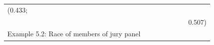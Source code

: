 \documentclass[11pt,a4paper,openany]{book}
\begin{document}
\begin{longtable}[]{@{}lrrrrrrr@{}}
\begin{minipage}[t]{0.07\columnwidth}
(0.433;\strut
\end{minipage}\tabularnewline
\begin{minipage}[t]{0.35\columnwidth}\raggedright\strut
\strut
\end{minipage} & \begin{minipage}[t]{0.05\columnwidth}\raggedleft\strut
\strut
\end{minipage} & \begin{minipage}[t]{0.04\columnwidth}\raggedleft\strut
\strut
\end{minipage} & \begin{minipage}[t]{0.06\columnwidth}\raggedleft\strut
\strut
\end{minipage} & \begin{minipage}[t]{0.11\columnwidth}\raggedleft\strut
\strut
\end{minipage} & \begin{minipage}[t]{0.05\columnwidth}\raggedleft\strut
\strut
\end{minipage} & \begin{minipage}[t]{0.05\columnwidth}\raggedleft\strut
\strut
\end{minipage} & \begin{minipage}[t]{0.07\columnwidth}\raggedleft\strut
0.507)\strut
\end{minipage}\tabularnewline
\begin{minipage}[t]{0.35\columnwidth}\raggedright\strut
Example 5.2: Race of members of jury panel\strut
\end{minipage} & \begin{minipage}[t]{0.05\columnwidth}\raggedleft\strut
\strut
\end{minipage} & \begin{minipage}[t]{0.04\columnwidth}\raggedleft\strut
\strut
\end{minipage} & \begin{minipage}[t]{0.06\columnwidth}\raggedleft\strut
\strut
\end{minipage} & \begin{minipage}[t]{0.11\columnwidth}\raggedleft\strut
\strut
\end{minipage} & \begin{minipage}[t]{0.05\columnwidth}\raggedleft\strut
\strut
\end{minipage} & \begin{minipage}[t]{0.05\columnwidth}\raggedleft\strut
\strut
\end{minipage} & \begin{minipage}[t]{0.07\columnwidth}\raggedleft\strut

\end{minipage}
\end{longtable}
\end{document}
